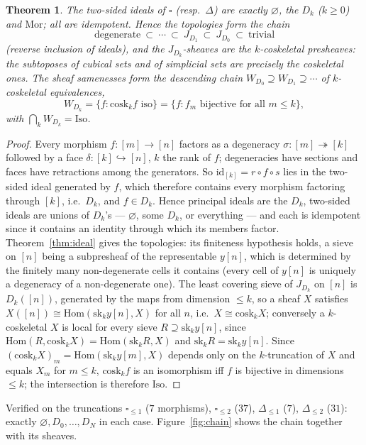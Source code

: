 \documentclass[11pt]{amsart}
\newtheorem{thm}{Theorem}[section]
\theoremstyle{definition}
\newcommand{\Mor}{\mathrm{Mor}}
\newcommand{\Iso}{\mathrm{Iso}}
\newcommand{\cosk}{\mathrm{cosk}}
\newcommand{\sk}{\mathrm{sk}}
\newcommand{\cube}{\square}
\begin{document}
\begin{thm}\label{thm:cube}
The two-sided ideals of $\cube$ (resp.\ $\Delta$) are exactly $\varnothing$,
the $D_k$ ($k\ge0$) and $\Mor$; all are idempotent. Hence the topologies form
the chain
\[
\text{degenerate}\ \subset\ \cdots\ \subset\ J_{D_1}\ \subset\ J_{D_0}\ \subset\ \text{trivial}
\]
(reverse inclusion of ideals), and the $J_{D_k}$-sheaves are the
$k$-coskeletal presheaves: the subtoposes of cubical sets and of simplicial
sets are precisely the coskeletal ones. The sheaf samenesses form the
descending chain $W_{D_0}\supseteq W_{D_1}\supseteq\cdots$ of
$k$-coskeletal equivalences,
\[
W_{D_k}=\{f:\cosk_kf\text{ iso}\}=\{f: f_m\text{ bijective for all }m\le k\},
\]
with $\bigcap_kW_{D_k}=\Iso$.
\end{thm}
\begin{proof}
Every morphism $f\colon[m]\to[n]$ factors as a degeneracy $\sigma\colon[m]\twoheadrightarrow[k]$
followed by a face $\delta\colon[k]\hookrightarrow[n]$, $k$ the rank of $f$;
degeneracies have sections and faces have retractions among the generators.
So $\mathrm{id}_{[k]}=r\circ f\circ s$ lies in the two-sided ideal generated by
$f$, which therefore contains every morphism factoring through $[k]$, i.e.\
$D_k$, and $f\in D_k$. Hence principal ideals are the $D_k$, two-sided ideals
are unions of $D_k$'s --- $\varnothing$, some $D_k$, or everything --- and
each is idempotent since it contains an identity through which its members
factor. Theorem~\ref{thm:ideal} gives the topologies: its finiteness hypothesis
holds, a sieve on $[n]$ being a subpresheaf of the representable $y[n]$,
which is determined by the finitely many non-degenerate cells it contains
(every cell of $y[n]$ is uniquely a degeneracy of a non-degenerate one). The least
covering sieve of $J_{D_k}$ on $[n]$ is $D_k([n])$, generated by the maps from
dimension $\le k$, so a sheaf $X$ satisfies $X([n])\cong\mathrm{Hom}(\sk_ky[n],X)$ for all
$n$, i.e.\ $X\cong\cosk_kX$; conversely a $k$-coskeletal $X$ is local for
every sieve $R\supseteq\sk_ky[n]$, since $\mathrm{Hom}(R,\cosk_kX)=
\mathrm{Hom}(\sk_kR,X)$ and $\sk_kR=\sk_ky[n]$. Since $(\cosk_kX)_m=\mathrm{Hom}(\sk_ky[m],X)$
depends only on the $k$-truncation of $X$ and equals $X_m$ for $m\le k$,
$\cosk_kf$ is an isomorphism iff $f$ is bijective in dimensions $\le k$; the
intersection is therefore $\Iso$.
\end{proof}
Verified on the truncations $\cube_{\le1}$ ($7$ morphisms), $\cube_{\le2}$
($37$), $\Delta_{\le1}$ ($7$), $\Delta_{\le2}$ ($31$): exactly
$\varnothing,D_0,\dots,D_N$ in each case. Figure~\ref{fig:chain} shows the
chain together with its sheaves.
\end{document}

